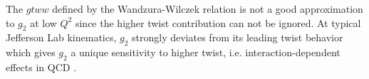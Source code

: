 The $gtww$ defined by the Wandzura-Wilczek relation is not a good approximation to $g_2$ at low $Q^2$ since the higher twist contribution can not be ignored. At typical Jefferson Lab kinematics, $g_2$ strongly deviates from its leading twist behavior which gives $g_2$ a unique sensitivity to higher twist, i.e. interaction-dependent effects in QCD \cite{Jaffe1990}.

